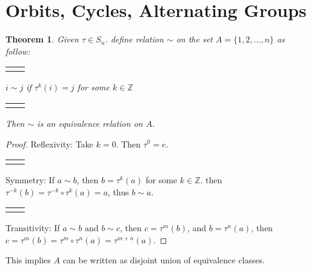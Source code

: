 \documentclass{article}
\theoremstyle{MyNonumberplain}
\theoremstyle{break}
\newtheorem*{proof}{Proof. }
\newcommand{\Z}{\mathbb{Z}}
\newcommand{\nline}{\begin{tabular}{ll}&\\\end{tabular}}
\newcommand{\infixand}{\text{ and }}
\theoremstyle{break}
\newtheorem{theorem}{Theorem}[section]
\theoremstyle{break}
\theoremstyle{definition}
\theoremstyle{break}
\begin{document}
\newpage

\section{Orbits, Cycles, Alternating Groups}

\begin{thmbox}
    \begin{theorem}
        Given $\tau \in S_n$. define relation $\sim$ on the set $A = \{ 1, 2, \ldots,
        n \}$ as follow:

        \nline

        \begin{center}
            $i\sim j$ if $\tau^k(i)=j$ for some $k\in\Z$
        \end{center}

        \nline

        Then $\sim$ is an equivalence relation on $A$.
    \end{theorem}
    \begin{prfbox}
        \begin{proof}
            Reflexivity: Take $k = 0$. Then $\tau^0 = e$.

            \nline

            Symmetry: If $a \sim b$, then $b = \tau^k (a)$ for some $k \in \mathbb{Z}$.
            then $\tau^{- k} (b) = \tau^{- k} \circ \tau^k (a) = a$, thus $b \sim a$.

            \nline

            Transitivity: If $a \sim b \infixand b \sim c$, then $c = \tau^m (b)$, and $b
            = \tau^n (a)$, then $c = \tau^m (b) = \tau^m \circ \tau^n (a) = \tau^{m + n}
            (a)$.
        \end{proof}
    \end{prfbox}
    This implies $A$ can be written as disjoint union of equivalence classes.
\end{thmbox}
\end{document}
